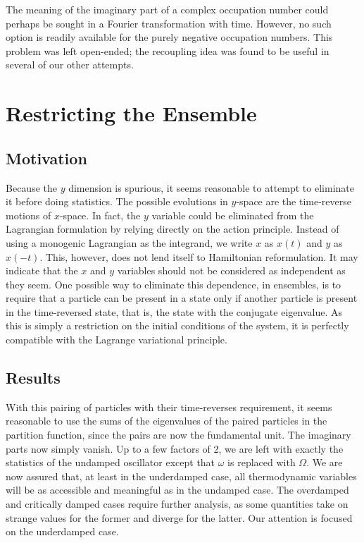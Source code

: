 The meaning of the imaginary part of a complex occupation number could perhaps
be sought in a Fourier transformation with time.  However, no such option is
readily available for the purely negative occupation numbers.  This problem
was left open-ended; the recoupling idea was found to be useful in several
of our other attempts.

\section{Restricting the Ensemble}

\subsection{Motivation}

Because the $y$ dimension is spurious, it seems reasonable to attempt to
eliminate it before doing statistics.  The possible evolutions in $y$-space
are the time-reverse motions of $x$-space.  In fact, the $y$ variable could
be eliminated from the Lagrangian formulation by relying directly on the
action principle.  Instead of using a monogenic Lagrangian as the integrand,
we write $x$ as $x(t)$ and $y$ as $x(-t)$.  This, however, does not lend
itself to Hamiltonian reformulation.  It may indicate that the $x$ and $y$
variables should not be considered as independent as they seem.  One possible
way to eliminate this dependence, in ensembles, is to require that a particle
can be present in a state only if another particle is present in the
time-reversed state, that is, the state with the conjugate eigenvalue.  As this
is simply a restriction on the initial conditions of the system, it is 
perfectly compatible with the Lagrange variational principle.

\subsection{Results}

With this pairing of particles with their time-reverses requirement, it seems 
reasonable to use the sums of the eigenvalues
of the paired particles in the partition function, since the pairs are now
the fundamental unit.  The imaginary parts now simply vanish.  Up to a
few factors of 2, we are left with exactly the statistics of the undamped
oscillator except that $\omega$ is replaced with $\Omega.$  We are now assured
that, at least in the underdamped case, all thermodynamic variables will be
as accessible and meaningful as in the undamped case.  The overdamped and
critically damped cases require further analysis, as some quantities take on
strange values for the former and diverge for the latter.  Our attention is
focused on the underdamped case.

